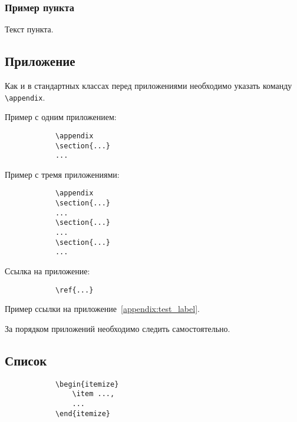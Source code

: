 \documentclass[14pt, a4paper, titlepage]{extarticle}
\renewcommand{\thesection}{\Asbuk{section}}
\let\oldsec\section
\renewcommand{\section}{
        \clearpage
        \phantomsection
        \refstepcounter{section}
        \addcontentsline{toc}{section}{\appendixname~\thesection}

        \oldsec*}
\begin{document}
        \subsubsection{Пример пункта}
            Текст пункта.

        \subsection{Приложение}
            Как и в стандартных классах перед приложениями необходимо указать команду \verb"\appendix".

            Пример с одним приложением:
            \begin{verbatim}
            \appendix
            \section{...}
            ...
            \end{verbatim}

            Пример с тремя приложениями:
            \begin{verbatim}
            \appendix
            \section{...}
            ...
            \section{...}
            ...
            \section{...}
            ...
            \end{verbatim}

            Ссылка на приложение:
            \begin{verbatim}
            \ref{...}
            \end{verbatim}

            Пример ссылки на приложение~\ref{appendix:test_label}.

            За порядком приложений необходимо следить самостоятельно.

        \subsection{Список}
            \begin{verbatim}
            \begin{itemize}
                \item ...,
                ...
            \end{itemize}
            \end{verbatim}
\end{document}
